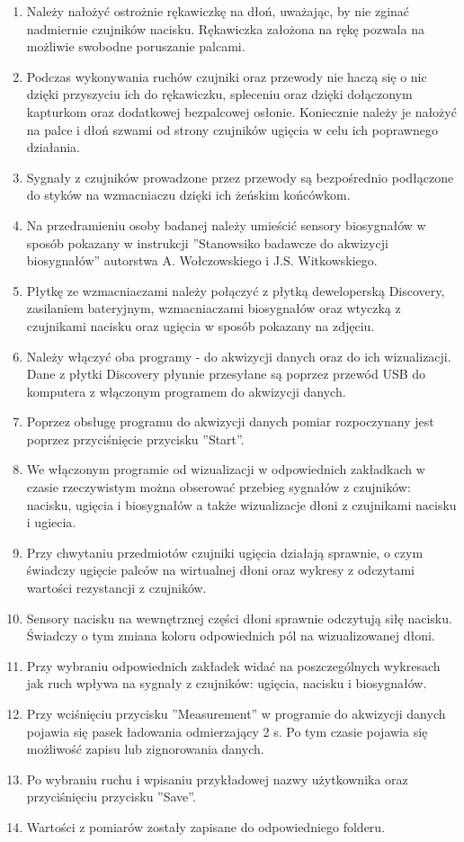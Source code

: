 \documentclass{article}
\begin{document}
\begin{enumerate}
  \item Należy nałożyć ostrożnie rękawiczkę na dłoń, uważając, by nie zginać nadmiernie czujników nacisku. Rękawiczka założona na rękę pozwala na możliwie swobodne poruszanie palcami.
	\item Podczas wykonywania ruchów czujniki oraz przewody nie haczą się o nic dzięki przyszyciu ich do rękawiczku, spleceniu oraz dzięki dołączonym kapturkom oraz dodatkowej bezpalcowej osłonie. Koniecznie należy je nałożyć na palce i dłoń szwami od strony czujników ugięcia w celu ich poprawnego działania.
	\item Sygnały z czujników prowadzone przez przewody są bezpośrednio podłączone do styków na wzmacniaczu dzięki ich żeńskim końcówkom.
	\item Na przedramieniu osoby badanej należy umieścić sensory biosygnałów w sposób pokazany w instrukcji ''Stanowsiko badawcze do akwizycji biosygnałów'' autorstwa A. Wołczowskiego i J.S. Witkowskiego.
	\item Płytkę ze wzmacniaczami należy połączyć z płytką deweloperską Discovery, zasilaniem bateryjnym, wzmacniaczami biosygnałów oraz wtyczką z czujnikami nacisku oraz ugięcia w sposób pokazany na zdjęciu.
	\item Należy włączyć oba programy - do akwizycji danych oraz do ich wizualizacji. Dane z płytki Discovery płynnie przesyłane są poprzez przewód USB do komputera z włączonym programem do akwizycji danych.
	\item Poprzez obsługę programu do akwizycji danych pomiar rozpoczynany jest poprzez przyciśnięcie przycisku ''Start''.
	\item We włączonym programie od wizualizacji w odpowiednich zakładkach w czasie rzeczywistym można obserować przebieg sygnałów z czujników: nacisku, ugięcia i biosygnałów a także wizualizacje dłoni z czujnikami nacisku i ugiecia.
	\item Przy chwytaniu przedmiotów czujniki ugięcia działają sprawnie, o czym świadczy ugięcie palców na wirtualnej dłoni oraz wykresy z odczytami wartości rezystancji z czujników.
	\item Sensory nacisku na wewnętrznej części dłoni sprawnie odczytują siłę nacisku. Świadczy o tym zmiana koloru odpowiednich pól na wizualizowanej dłoni.
	\item Przy wybraniu odpowiednich zakładek widać na poszczególnych wykresach jak ruch wpływa na sygnały z czujników: ugięcia, nacisku i biosygnałów.
	\item Przy wciśnięciu przycisku ''Measurement'' w programie do akwizycji danych pojawia się pasek ładowania odmierzający 2 s. Po tym czasie pojawia się możliwość zapisu lub zignorowania danych.
	\item Po wybraniu ruchu i wpisaniu przykładowej nazwy użytkownika oraz przyciśnięciu przycisku ''Save''.
	\item Wartości z pomiarów zostały zapisane do odpowiedniego folderu.	
\end{enumerate}
\end{document}
